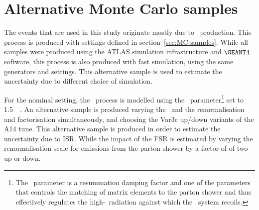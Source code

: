 \section{Alternative Monte Carlo samples}


The events that are used in this study originate mostly due to 
\ttbar\ production. 
This process is produced with 
settings defined in section~\ref{sec:MC samples}.
While all samples were 
produced using the ATLAS simulation infrastructure and $\GEANT4$ software,
this process is also produced with fast simulation, using the same generators 
and settings. 
This alternative sample is used to estimate the uncertainty due to different choice 
of simulation. 

For the nominal setting, the \ttbar\ process is modelled using the
\hdamp\ parameter\footnote{The
  \hdamp\ parameter is a resummation damping factor and one of the
  parameters that controls the matching of \powheg matrix elements to
  the parton shower and thus effectively regulates the
  high-\pt\ radiation against which the \ttbar\ system recoils.} set
to 1.5~\mtop~\cite{ATL-PHYS-PUB-2016-020}. 
An alternative sample is produced varying the \hdamp\ and 
the renormalisation and factorisation simultaneously,
and choosing the Var3c up/down variants of the A14 tune. 
This alternative sample is produced in order to estimate the 
uncertainty due to ISR. 
While the impact of the FSR is estimated by varying the renormalisation
scale for emissions from the parton shower by a factor of of two up or down. 

